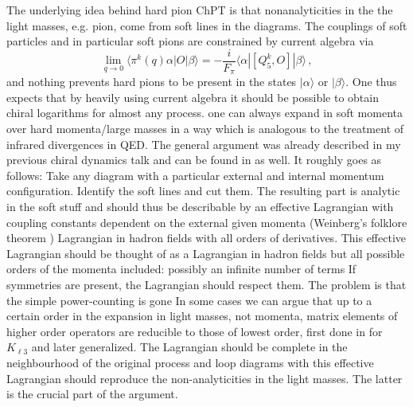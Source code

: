 \documentclass[cits,hyper]{PoS}
\begin{document}
The underlying idea behind hard pion ChPT is that nonanalyticities in the
the light masses, e.g. pion, come from soft lines in the diagrams.
The couplings of soft particles and in particular soft pions are constrained by
current algebra via
\begin{equation}
\lim_{q\to 0}\langle\pi^k(q)\alpha|O|\beta\rangle
 = -\frac{i}{F_\pi}\langle\alpha|\left[Q_5^k,O\right]|\beta\rangle\,,
\end{equation}
and nothing prevents hard pions to be present in the states $|\alpha\rangle$
or $|\beta\rangle$. One thus expects that by heavily using current algebra
it should be possible to obtain chiral logarithms for almost any process.
 one can always expand in
soft momenta over hard momenta/large masses in a way which is analogous to
the treatment of infrared divergences in QED. The general argument was
already described in my previous chiral dynamics talk \cite{talk2} and
can be found in \cite{HP2,HP3,HP4} as well. It roughly goes as follows:
Take any diagram with a particular external and internal momentum configuration.
Identify the soft lines and cut them.
The resulting part is analytic in the soft stuff and
should thus be describable by an effective Lagrangian with
coupling constants dependent on the external given
momenta (Weinberg's folklore theorem \cite{Weinberg0})
Lagrangian in hadron fields with all orders of derivatives.
This effective Lagrangian should be thought of as a Lagrangian in hadron fields
but all possible orders of the momenta included: possibly
an infinite number of terms
If symmetries are present, the Lagrangian should respect them.
The problem is that the simple power-counting is gone
In some cases we can argue that up to a certain order in
the expansion in light masses, not momenta, matrix
elements of higher order operators are reducible to those
of lowest order, first done in \cite{HP1} for $K_{\ell3}$ and later generalized.
The Lagrangian should be complete in the neighbourhood of the
original process and loop diagrams with this effective Lagrangian should
reproduce the non-analyticities in the light masses.
The latter is the crucial part of the argument.
\end{document}

